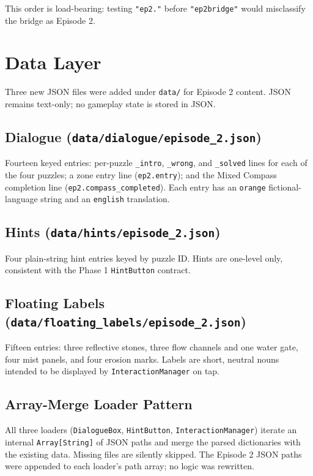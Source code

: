 \documentclass[12pt, a4paper]{article}
\begin{document}
This order is load-bearing: testing \texttt{"ep2."} before \texttt{"ep2bridge"}
would misclassify the bridge as Episode 2.

\section{Data Layer}

Three new JSON files were added under \texttt{data/} for Episode 2 content.
JSON remains text-only; no gameplay state is stored in JSON.

\subsection{Dialogue (\texttt{data/dialogue/episode\_2.json})}

Fourteen keyed entries: per-puzzle \texttt{\_intro}, \texttt{\_wrong}, and
\texttt{\_solved} lines for each of the four puzzles; a zone entry line
(\texttt{ep2.entry}); and the Mixed Compass completion line
(\texttt{ep2.compass\_completed}). Each entry has an \texttt{orange}
fictional-language string and an \texttt{english} translation.

\subsection{Hints (\texttt{data/hints/episode\_2.json})}

Four plain-string hint entries keyed by puzzle ID. Hints are one-level only,
consistent with the Phase 1 \texttt{HintButton} contract.

\subsection{Floating Labels (\texttt{data/floating\_labels/episode\_2.json})}

Fifteen entries: three reflective stones, three flow channels and one water
gate, four mist panels, and four erosion marks. Labels are short, neutral
nouns intended to be displayed by \texttt{InteractionManager} on tap.

\subsection{Array-Merge Loader Pattern}

All three loaders (\texttt{DialogueBox}, \texttt{HintButton},
\texttt{InteractionManager}) iterate an internal \texttt{Array[String]} of
JSON paths and merge the parsed dictionaries with the existing data. Missing
files are silently skipped. The Episode 2 JSON paths were appended to each
loader's path array; no logic was rewritten.
\end{document}
